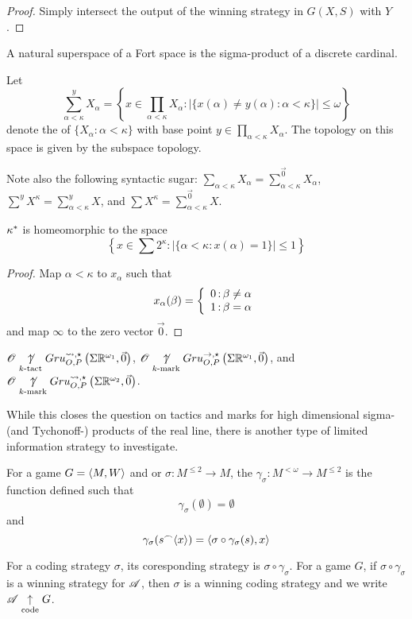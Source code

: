 \begin{proof}
  Simply intersect the output of the winning strategy in $G(X,S)$ with $Y$.
\end{proof}

A natural superspace of a Fort space is the sigma-product of a discrete
cardinal.

\begin{defn}
  Let
    \[
      \sum_{\alpha<\kappa}^y X_\alpha
        =
      \left\{
        x \in \prod_{\alpha<\kappa} X_\alpha
         :
        |\{x(\alpha)\not=y(\alpha):\alpha<\kappa\}|\leq\omega
      \right\}
    \]
  denote the 
  of $\{X_\alpha:\alpha<\kappa\}$ with base point
  $y\in \prod_{\alpha<\kappa}X_\alpha$. The topology on this space
  is given by the subspace topology.

  Note also the following syntactic sugar:
  $\sum_{\alpha<\kappa}X_\alpha=\sum_{\alpha<\kappa}^{\vec 0}X_\alpha$,
  $\sum^{y} X^\kappa = \sum_{\alpha<\kappa}^{y} X$, and
  $\sum X^\kappa = \sum_{\alpha<\kappa}^{\vec 0} X$.
\end{defn}

\begin{prop}
  $\kappa^*$ is homeomorphic to the space
  \[
    \left\{
    x\in \sum 2^\kappa
      :
    |\{\alpha<\kappa:x(\alpha)=1\}|\leq 1
    \right\}
  \]
\end{prop}

\begin{proof}
  Map $\alpha<\kappa$ to $x_\alpha$ such that
  \[
    x_\alpha(\beta) =
    \left\{
      \begin{array}{l@{\,:\,}l}
        0 & \beta\not=\alpha \\
        1 & \beta=\alpha
      \end{array}
    \right.
  \]
  and map $\infty$ to the zero vector $\vec0$.
\end{proof}

\begin{cor}
  $\mathscr{O}\underset{k\text{-tact}}{\not\uparrow}Gru_{O,P}^{\leadsto,\star}\left({\Sigma\mathbb{R}^{\omega_1}},{\vec0}\right)$,
  $\mathscr{O}\underset{k\text{-mark}}{\not\uparrow}Gru_{O,P}^{\to,\star}\left({\Sigma\mathbb{R}^{\omega_1}},{\vec0}\right)$, and
  $\mathscr{O}\underset{k\text{-mark}}{\not\uparrow}Gru_{O,P}^{\leadsto,\star}\left({\Sigma\mathbb{R}^{\omega_2}},{\vec0}\right)$.
\end{cor}

While this closes the question on tactics and marks for high dimensional
sigma- (and Tychonoff-) products of the real line, there is another type of
limited information strategy to investigate.

\begin{defn}
  For a game $G=\langle M,W\rangle$ and  or 
  $\sigma:M^{\leq2}\to M$, the 
  $\gamma_\sigma: M^{<\omega}\to M^{\leq2}$ is the function defined such that
    \[
      \gamma_\sigma(\emptyset) = \emptyset
    \]
  and
    \[
      \gamma_\sigma(s{^\frown}\langle x\rangle) = \langle\sigma\circ\gamma_\sigma(s),x\rangle
    \]

  For a coding strategy $\sigma$, its coresponding strategy is
  $\sigma\circ\gamma_\sigma$. For a game $G$, if $\sigma\circ\gamma_\sigma$
  is a winning strategy for $\mathscr{A}$, then $\sigma$ is a winning coding
  strategy and we write $\mathscr{A} \underset{\text{code}}{\uparrow} G$.
\end{defn}


